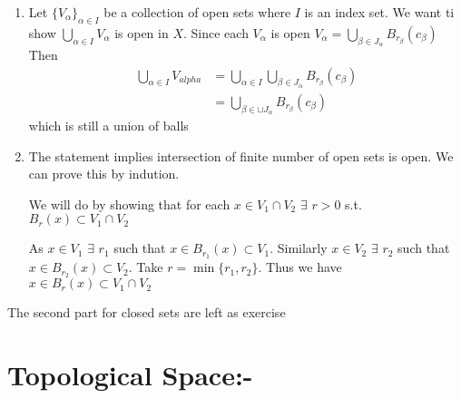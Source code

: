 \begin{myproof}
	\begin{enumerate}
		\item Let $\{V_{\alpha}\}_{\alpha\in I}$ be a collection of open sets where $I$ is an index set. We want ti show $\bigcup\limits_{\alpha\in I}V_{\alpha}$ is open in $X$. Since each $V_{\alpha}$ is open $V_{\alpha}=\bigcup\limits_{\beta \in J_{\alpha}} B_{r_{\beta}}(c_{\beta})$ Then \begin{align*}
			\bigcup\limits_{\alpha\in I} V_{alpha} & =\bigcup\limits_{\alpha\in I}\bigcup\limits_{\beta \in J_{\alpha}}B_{r_{\beta}}(c_{\beta}) \\
			& =\bigcup\limits_{\beta \in \sqcup J_{\alpha}}B_{r_{\beta}}(c_{\beta})
		\end{align*} which is still a union of balls
	\Qed
	\item \setlength{\parindent}{1cm}The statement implies intersection of finite number of open sets is open. We can prove this by indution. 
	
	We will do by showing that for each $x\in V_1\cap V_2$ $\exists$ $r>0$ s.t. $B_r(x)\subset V_1\cap V_2$
	 
	 	\begin{center}
	 \end{center}
 As $x\in V_1$ $\exists$ $r_1$ such that $x\in B_{r_1}(x)\subset V_1$. Similarly $x\in V_2$ $\exists$ $r_2$ such that $x\in B_{r_2}(x)\subset V_2$. Take $r=\min\{r_1,r_2\}$. Thus we have $x\in B_r(x)\subset V_1\cap V_2$
	
	\end{enumerate}
The second part for closed sets are left as exercise
\end{myproof}

\section{Topological Space:-}


